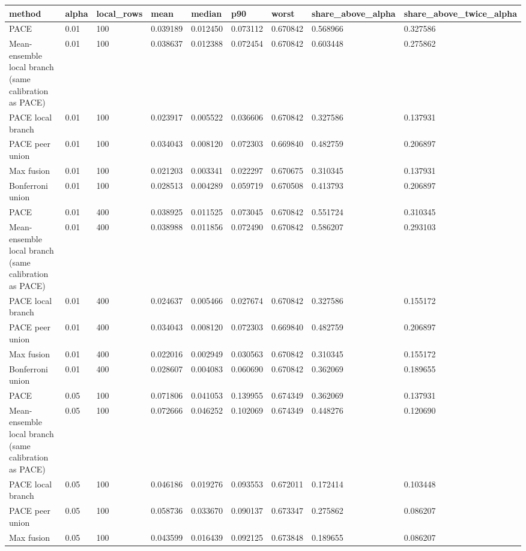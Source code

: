 \begin{tabular}{lllllllll}
\toprule
method & alpha & local\_rows & mean & median & p90 & worst & share\_above\_alpha & share\_above\_twice\_alpha \\
\midrule
PACE & 0.01 & 100 & 0.039189 & 0.012450 & 0.073112 & 0.670842 & 0.568966 & 0.327586 \\
Mean-ensemble local branch (same calibration as PACE) & 0.01 & 100 & 0.038637 & 0.012388 & 0.072454 & 0.670842 & 0.603448 & 0.275862 \\
PACE local branch & 0.01 & 100 & 0.023917 & 0.005522 & 0.036606 & 0.670842 & 0.327586 & 0.137931 \\
PACE peer union & 0.01 & 100 & 0.034043 & 0.008120 & 0.072303 & 0.669840 & 0.482759 & 0.206897 \\
Max fusion & 0.01 & 100 & 0.021203 & 0.003341 & 0.022297 & 0.670675 & 0.310345 & 0.137931 \\
Bonferroni union & 0.01 & 100 & 0.028513 & 0.004289 & 0.059719 & 0.670508 & 0.413793 & 0.206897 \\
PACE & 0.01 & 400 & 0.038925 & 0.011525 & 0.073045 & 0.670842 & 0.551724 & 0.310345 \\
Mean-ensemble local branch (same calibration as PACE) & 0.01 & 400 & 0.038988 & 0.011856 & 0.072490 & 0.670842 & 0.586207 & 0.293103 \\
PACE local branch & 0.01 & 400 & 0.024637 & 0.005466 & 0.027674 & 0.670842 & 0.327586 & 0.155172 \\
PACE peer union & 0.01 & 400 & 0.034043 & 0.008120 & 0.072303 & 0.669840 & 0.482759 & 0.206897 \\
Max fusion & 0.01 & 400 & 0.022016 & 0.002949 & 0.030563 & 0.670842 & 0.310345 & 0.155172 \\
Bonferroni union & 0.01 & 400 & 0.028607 & 0.004083 & 0.060690 & 0.670842 & 0.362069 & 0.189655 \\
PACE & 0.05 & 100 & 0.071806 & 0.041053 & 0.139955 & 0.674349 & 0.362069 & 0.137931 \\
Mean-ensemble local branch (same calibration as PACE) & 0.05 & 100 & 0.072666 & 0.046252 & 0.102069 & 0.674349 & 0.448276 & 0.120690 \\
PACE local branch & 0.05 & 100 & 0.046186 & 0.019276 & 0.093553 & 0.672011 & 0.172414 & 0.103448 \\
PACE peer union & 0.05 & 100 & 0.058736 & 0.033670 & 0.090137 & 0.673347 & 0.275862 & 0.086207 \\
Max fusion & 0.05 & 100 & 0.043599 & 0.016439 & 0.092125 & 0.673848 & 0.189655 & 0.086207 \\

\end{tabular}
